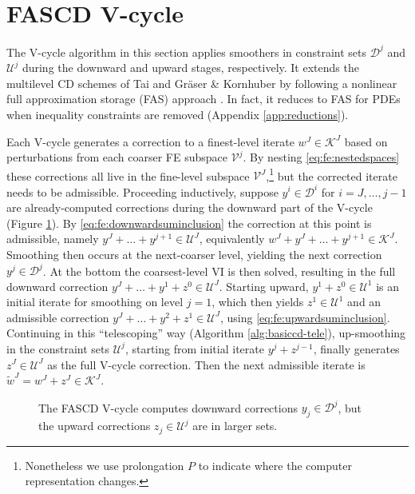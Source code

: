 \documentclass[letterpaper,final,12pt,reqno]{amsart}
\theoremstyle{cstyle}
\theoremstyle{cstyle*}
\theoremstyle{dstyle}
\numberwithin{equation}{section}
\numberwithin{figure}{section}
\numberwithin{table}{section}
\numberwithin{theorem}{section}
\begin{document}
\section{FASCD V-cycle} \label{sec:vcycle}

The V-cycle algorithm in this section applies smoothers in constraint sets $\mathcal{D}^j$ and $\mathcal{U}^j$ during the downward and upward stages, respectively.  It extends the multilevel CD schemes of Tai \cite{Tai2003} and Gr\"aser \& Kornhuber \cite[Algorithm 4.7]{GraeserKornhuber2009} by following a nonlinear full approximation storage (FAS) approach \cite{BrandtLivne2011}.  In fact, it reduces to FAS for PDEs when inequality constraints are removed (Appendix \ref{app:reductions}).

Each V-cycle generates a correction to a finest-level iterate $w^J \in \mathcal{K}^J$ based on perturbations from each coarser FE subspace $\mathcal{V}^j$.  By nesting \eqref{eq:fe:nestedspaces} these corrections all live in the fine-level subspace $\mathcal{V}^J$,\footnote{Nonetheless we use prolongation $P$ to indicate where the computer representation changes.} but the corrected iterate needs to be admissible.  Proceeding inductively, suppose $y^i \in \mathcal{D}^i$ for $i=J,\dots,j-1$ are already-computed corrections during the downward part of the V-cycle (Figure \ref{fig:fascdvcycle}).  By \eqref{eq:fe:downwardsuminclusion} the correction at this point is admissible, namely $y^J + \dots + y^{j+1} \in \mathcal{U}^J$, equivalently $w^J + y^J + \dots + y^{j+1} \in \mathcal{K}^J$.  Smoothing then occurs at the next-coarser level, yielding the next correction $y^j \in \mathcal{D}^j$.  At the bottom the coarsest-level VI is then solved, resulting in the full downward correction $y^J + \dots + y^1 + z^0 \in \mathcal{U}^J$.  Starting upward, $y^1 + z^0 \in \mathcal{U}^1$ is an initial iterate for smoothing on level $j=1$, which then yields $z^1 \in \mathcal{U}^1$ and an admissible correction $y^J + \dots + y^2 + z^1 \in \mathcal{U}^J$, using \eqref{eq:fe:upwardsuminclusion}.  Continuing in this ``telescoping'' way (Algorithm \ref{alg:basiccd-tele}), up-smoothing in the constraint sets $\mathcal{U}^j$, starting from initial iterate $y^j+z^{j-1}$, finally generates $z^J\in \mathcal{U}^J$ as the full V-cycle correction.  Then the next admissible iterate is $\tilde{w}^J = w^J + z^J \in \mathcal{K}^J$.

\begin{figure}[ht]
\begin{center}

\end{center}
\caption{The FASCD V-cycle computes downward corrections $y_j \in \mathcal{D}^j$, but the upward corrections $z_j\in\mathcal{U}^j$ are in larger sets.}
\label{fig:fascdvcycle}
\end{figure}
\end{document}
